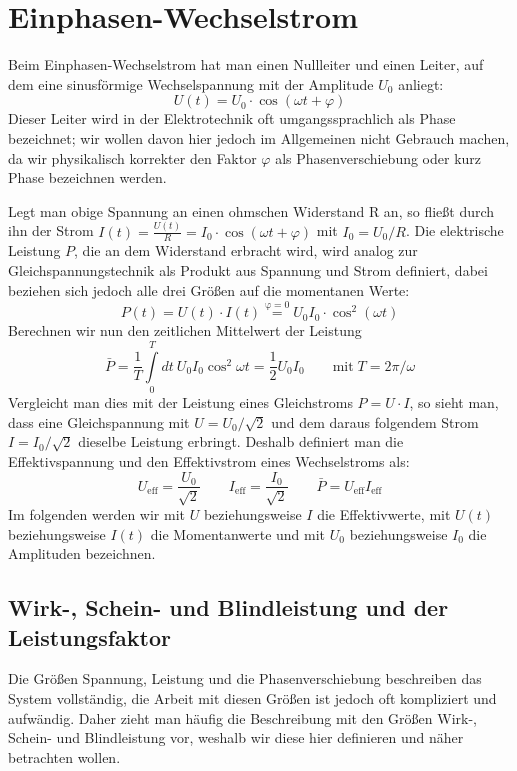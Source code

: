 
\section{Einphasen-Wechselstrom}\label{wechsel}
Beim Einphasen-Wechselstrom hat man einen Nullleiter und einen Leiter, auf dem eine sinusförmige Wechselspannung mit der Amplitude $U_0$ anliegt:
\begin{equation}
U(t)=U_0 \cdot \cos(\omega t + \varphi)
\end{equation}
Dieser Leiter wird in der Elektrotechnik oft umgangssprachlich als Phase bezeichnet; wir wollen davon hier jedoch im Allgemeinen nicht Gebrauch machen, da wir physikalisch korrekter den Faktor $\varphi$ als Phasenverschiebung oder kurz Phase bezeichnen werden.

Legt man obige Spannung an einen ohmschen Widerstand R an, so fließt durch ihn der Strom $I(t)= \frac{U(t)}{R} = I_0 \cdot \cos(\omega t + \varphi)$ mit $I_0 = U_0/R$.
Die elektrische Leistung $P$, die an dem Widerstand erbracht wird, wird analog zur Gleichspannungstechnik als Produkt aus Spannung und Strom definiert, dabei beziehen sich jedoch alle drei Größen auf die momentanen Werte:
\begin{equation}
P(t) = U(t) \cdot I(t) \stackrel{\mathrm{\varphi=0}}= U_0 I_0 \cdot \cos^2(\omega t)
\end{equation}
Berechnen wir nun den zeitlichen Mittelwert der Leistung
\begin{equation}\label{eq:Wirkleistung_ohne_phi}
\bar{P}=\frac1T \int\limits_0^T dt\: U_0 I_0 \cos^2 \omega t = \frac12 U_0 I_0 \qquad\mathrm{mit}\; T=2\pi/\omega
\end{equation}
Vergleicht man dies mit der Leistung eines Gleichstroms $P=U\cdot I$, so sieht man, dass eine Gleichspannung mit $U=U_0 / \sqrt2$ und dem daraus folgendem Strom $I=I_0 / \sqrt2$ dieselbe Leistung erbringt.
Deshalb definiert man die Effektivspannung und den Effektivstrom eines Wechselstroms als:
\begin{equation*}
U_{\mathrm{eff}} = \frac{U_0}{\sqrt2} \qquad I_{\mathrm{eff}} = \frac{I_0}{\sqrt2} \qquad \bar{P}=U_{\mathrm{eff}}I_{\mathrm{eff}}
\end{equation*}
Im folgenden werden wir mit $U$ beziehungsweise $I$ die Effektivwerte, mit $U(t)$ beziehungsweise $I(t)$ die Momentanwerte und mit $U_0$ beziehungsweise $I_0$ die Amplituden bezeichnen.





\subsection{Wirk-, Schein- und Blindleistung und der Leistungsfaktor}
Die Größen Spannung, Leistung und die Phasenverschiebung beschreiben das System vollständig, die Arbeit mit diesen Größen ist jedoch oft kompliziert und aufwändig. Daher zieht man häufig die Beschreibung mit den Größen Wirk-, Schein- und Blindleistung vor, weshalb wir diese hier definieren und näher betrachten wollen.

